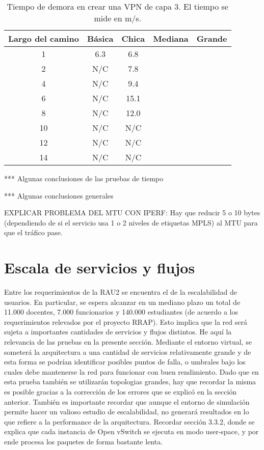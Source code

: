 \begin{table}[ht]
	\caption{Tiempo de demora en crear una VPN de capa 3. El tiempo se mide en m/s.}
	\centering 
	\begin{tabular}{c c c c c}
		\hline\hline
		Largo del camino & Básica & Chica & Mediana  & Grande \\ [0.5ex]
		\hline
		1 & 6.3 & 6.8 &  &  \\
		2 & N/C & 7.8 &  &  \\
		4 & N/C & 9.4 &  &  \\
		6 & N/C & 15.1 &  &  \\
		8 & N/C & 12.0 &  &  \\
		10 & N/C & N/C &  &  \\
		12 & N/C & N/C &  &  \\
		14 & N/C & N/C &  &  \\ [1ex]
		\hline
	\end{tabular}
	\label{table:tiempo_vpn_3}
\end{table}
*** Algunas conclusiones de las pruebas  de tiempo

*** Algunas conclusiones generales

EXPLICAR PROBLEMA DEL MTU CON IPERF: Hay que reducir 5 o 10 bytes (dependiendo de si el servicio usa 1 o 2 niveles de etiquetas MPLS) al MTU para que el tráfico pase.\\

\section{Escala de servicios y flujos}
Entre los requerimientos de la RAU2 se encuentra el de la escalabilidad de usuarios. En particular, se espera alcanzar en un mediano plazo un total de 11.000 docentes, 7.000 funcionarios y 140.000 estudiantes (de acuerdo a los requerimientos relevados por el proyecto RRAP). Esto implica que la red será sujeta a importantes cantidades de servicios y flujos distintos. He aquí la relevancia de las pruebas en la presente sección. Mediante el entorno virtual, se someterá la arquitectura a una cantidad de servicios relativamente grande y de esta forma se podrían identificar posibles puntos de falla, o umbrales bajo los cuales debe mantenerse la red para funcionar con buen rendimiento. Dado que en esta prueba también se utilizarán topologias grandes, hay que recordar la misma es posible gracias a la corrección de los errores que se explicó en la sección anterior. También es importante recordar que aunque el entorno de simulación permite hacer un valioso estudio de escalabilidad, no generará resultados en lo que refiere a la performance de la arquitectura. Recordar sección 3.3.2, donde se explica que cada instancia de Open vSwitch se ejecuta en modo user-space, y por ende procesa los paquetes de forma bastante lenta.

